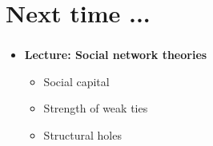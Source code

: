 \documentclass[8pt]{beamer}
\begin{document}
\section*{Next time ...}

\bgroup
{}
\begin{frame}[plain]{}
\begin{center}
\color{white}{\Huge\insertsection}
\end{center}
\end{frame}
\egroup


\begin{frame}
\frametitle{\insertsection}

\begin{itemize}

\item 	\textbf{Lecture: Social network theories}
	\begin{itemize}
	\item Social capital
	\item Strength of weak ties
	\item Structural holes
	\end{itemize}

		
\end{itemize}

\end{frame}

\end{document}
